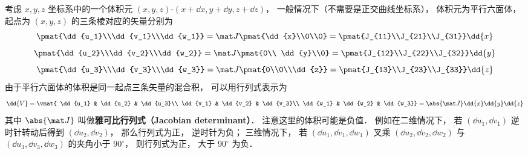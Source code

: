 考虑 $x,y,z$ 坐标系中的一个体积元 $(x,y,z)$-$(x+ \dd{x}, y + \dd{y}, z + \dd{z})$，  一般情况下（不需要是正交曲线坐标系）， 体积元为平行六面体， 起点为 $(x,y,z)$  的三条棱对应的矢量分别为
\begin{equation}
\pmat{\dd{u_1}\\\dd{v_1}\\\dd{w_1}} = 
\mat J\pmat{\dd{x}\\0\\0} = 
\pmat{J_{11}\\J_{21}\\J_{31}} \dd{x}
\end{equation} 
\begin{equation}
\pmat{\dd{u_2}\\\dd{v_2}\\\dd{w_2}} = 
\mat J \pmat{0\\ \dd{y}\\0} = 
\pmat{J_{12}\\J_{22}\\J_{32}} \dd{y}
\end{equation} 
\begin{equation}
\pmat{\dd{u_3}\\\dd{v_3}\\\dd{w_3}} = 
\mat J \pmat{0\\0\\\dd{z}} = 
\pmat{J_{13}\\J_{23}\\J_{33}} \dd{z}
\end{equation} 
由于平行六面体的体积是同一起点三条矢量的混合积， 可以用行列式表示为
\begin{equation}
\dd{V}
= \vmat{
\dd{u_1} & \dd{u_2} & \dd{u_3}\\
\dd{v_1} & \dd{v_2} & \dd{v_3}\\
\dd{w_1} & \dd{w_2} & \dd{w_3}}
= \abs{\mat J} \dd{x}\dd{y}\dd{z}
\end{equation}
其中 $\abs{\mat J}$  叫做\textbf{雅可比行列式（Jacobian determinant）}． 注意这里的体积可能是负值． 例如在二维情况下， 若 $(\dd{u_1},\dd{v_1})$ 逆时针转动后得到 $(\dd{u_2},\dd{v_2})$， 那么行列式为正， 逆时针为负； 三维情况下， 若 $(\dd{u_1},\dd{v_1},\dd{w_1})$ 叉乘 $(\dd{u_2},\dd{v_2},\dd{w_2})$ 与 $(\dd{u_3},\dd{v_3},\dd{w_3})$ 的夹角小于 $90^\circ$， 则行列式为正， 大于 $90^\circ$ 为负．

